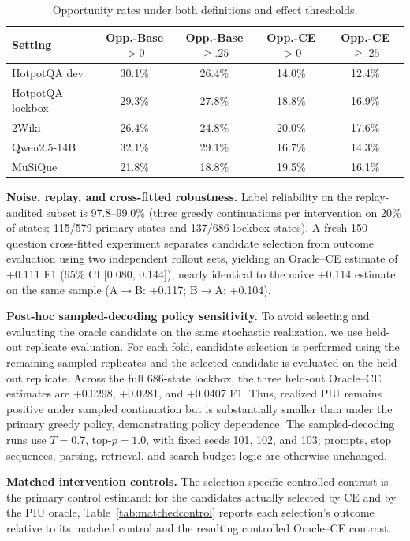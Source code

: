 \documentclass[10pt]{article}
\newcommand{\stitle}[1]{\vspace{0.4em}\noindent\textbf{#1}\hspace{0.6em}}
\begin{document}
\begin{table}[h]
\centering
\small
\caption{Opportunity rates under both definitions and effect thresholds.}
\label{tab:oppmag}
\begin{tabular}{lcccc}
\toprule
\textbf{Setting} & \textbf{Opp.-Base $>0$} & \textbf{Opp.-Base $\ge.25$} &
\textbf{Opp.-CE $>0$} & \textbf{Opp.-CE $\ge.25$} \\
\midrule
HotpotQA dev     & 30.1\% & 26.4\% & 14.0\% & 12.4\% \\
HotpotQA lockbox & 29.3\% & 27.8\% & 18.8\% & 16.9\% \\
2Wiki            & 26.4\% & 24.8\% & 20.0\% & 17.6\% \\
Qwen2.5-14B      & 32.1\% & 29.1\% & 16.7\% & 14.3\% \\
MuSiQue          & 21.8\% & 18.8\% & 19.5\% & 16.1\% \\
\bottomrule
\end{tabular}
\end{table}

\stitle{Noise, replay, and cross-fitted robustness.}
Label reliability on the replay-audited subset is 97.8--99.0\% (three
greedy continuations per intervention on 20\% of states; 115/579 primary
states and 137/686 lockbox states). A fresh 150-question cross-fitted
experiment separates candidate selection from outcome evaluation using two
independent rollout sets, yielding an Oracle--CE estimate of +0.111 F1
(95\% CI [0.080, 0.144]), nearly identical to the naive +0.114 estimate on
the same sample (A$\to$B: +0.117; B$\to$A: +0.104).

\stitle{Post-hoc sampled-decoding policy sensitivity.}
To avoid selecting and evaluating the oracle candidate on the same
stochastic realization, we use held-out replicate evaluation. For each
fold, candidate selection is performed using the remaining sampled
replicates and the selected candidate is evaluated on the held-out
replicate. Across the full 686-state lockbox, the three held-out
Oracle--CE estimates are +0.0298, +0.0281, and +0.0407 F1. Thus, realized
PIU remains positive under sampled continuation but is substantially
smaller than under the primary greedy policy, demonstrating policy
dependence. The sampled-decoding runs use $T=0.7$, top-$p=1.0$, with fixed
seeds 101, 102, and 103; prompts, stop sequences, parsing, retrieval, and
search-budget logic are otherwise unchanged.

\stitle{Matched intervention controls.}
The selection-specific controlled contrast is the primary control estimand:
for the candidates actually selected by CE and by the PIU oracle,
Table~\ref{tab:matchedcontrol} reports each selection's outcome relative to
its matched control and the resulting controlled Oracle--CE contrast.
\end{document}
